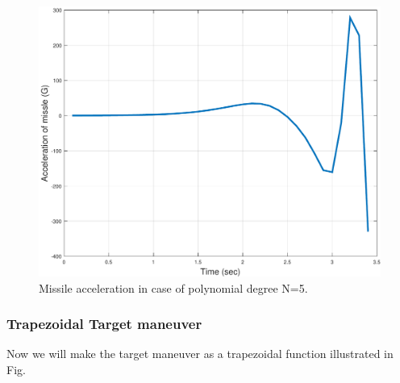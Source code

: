 \begin{figure}[htb]
	\centering
	\includegraphics[scale = 0.75]{fig/MissileAccelerationP5.pdf}
	\caption{Missile acceleration in case of polynomial degree N=5.}
	\label{missile accelerationP5}
\end{figure}


\subsubsection{Trapezoidal Target maneuver}
Now we will make the target maneuver as a trapezoidal function illustrated in Fig. 


